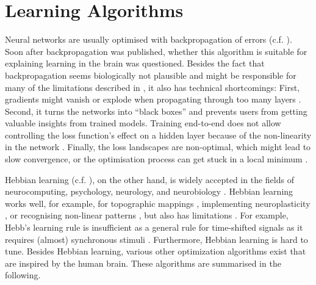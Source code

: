 \section{Learning Algorithms}
Neural networks are usually optimised with backpropagation of errors (c.f. ).
Soon after backpropagation was published, whether this algorithm is suitable for explaining learning in the brain  was questioned.
Besides the fact that backpropagation seems biologically not plausible and might be responsible for many of the limitations described in , it also has technical shortcomings:
First, gradients might vanish or explode when propagating through too many layers .
Second, it turns the networks into ``black boxes'' and prevents users from getting valuable insights from trained models.
Training end-to-end does not allow controlling the loss function's effect on a hidden layer because of the non-linearity in the network .
Finally, the loss landscapes are non-optimal, which might lead to slow convergence, or the optimisation process can get stuck in a local minimum  .

Hebbian learning (c.f. ), on the other hand, is widely accepted in the fields of neurocomputing, psychology, neurology, and neurobiology .
Hebbian learning works well, for example, for topographic mappings , implementing neuroplasticity , or recognising non-linear patterns , but also has limitations \cite{anderson_biased_1998}.
For example, Hebb's learning rule is insufficient as a general rule for time-shifted signals as it requires (almost) synchronous stimuli .
Furthermore, Hebbian learning is hard to tune.
Besides Hebbian learning, various other optimization algorithms exist that are inspired by the human brain. These algorithms are summarised in the following.


